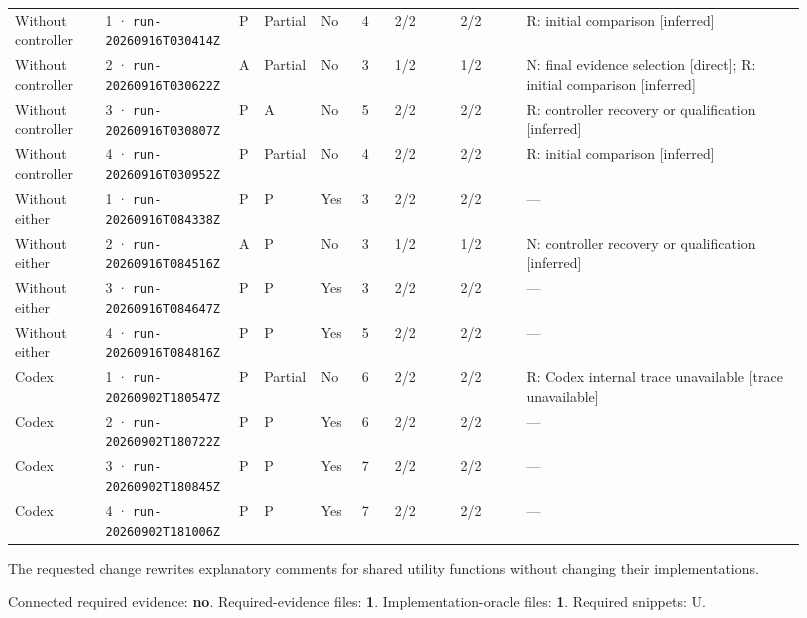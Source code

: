 \begin{landscape}
\begin{longtable}{@{}L{0.11\linewidth}L{0.16\linewidth}*{2}{L{0.022\linewidth}}L{0.05\linewidth}L{0.045\linewidth}L{0.08\linewidth}L{0.085\linewidth}L{0.346\linewidth}@{}}
Without controller & 1 · \texttt{run-20260916\allowbreak T030414Z} & P & Partial & No & 4 & 2/2 & 2/2 & R: initial comparison [inferred] \\
Without controller & 2 · \texttt{run-20260916\allowbreak T030622Z} & A & Partial & No & 3 & 1/2 & 1/2 & N: final evidence selection [direct]; R: initial comparison [inferred] \\
Without controller & 3 · \texttt{run-20260916\allowbreak T030807Z} & P & A & No & 5 & 2/2 & 2/2 & R: controller recovery or qualification [inferred] \\
Without controller & 4 · \texttt{run-20260916\allowbreak T030952Z} & P & Partial & No & 4 & 2/2 & 2/2 & R: initial comparison [inferred] \\
Without either & 1 · \texttt{run-20260916\allowbreak T084338Z} & P & P & Yes & 3 & 2/2 & 2/2 & --- \\
Without either & 2 · \texttt{run-20260916\allowbreak T084516Z} & A & P & No & 3 & 1/2 & 1/2 & N: controller recovery or qualification [inferred] \\
Without either & 3 · \texttt{run-20260916\allowbreak T084647Z} & P & P & Yes & 3 & 2/2 & 2/2 & --- \\
Without either & 4 · \texttt{run-20260916\allowbreak T084816Z} & P & P & Yes & 5 & 2/2 & 2/2 & --- \\
Codex & 1 · \texttt{run-20260902\allowbreak T180547Z} & P & Partial & No & 6 & 2/2 & 2/2 & R: Codex internal trace unavailable [trace unavailable] \\
Codex & 2 · \texttt{run-20260902\allowbreak T180722Z} & P & P & Yes & 6 & 2/2 & 2/2 & --- \\
Codex & 3 · \texttt{run-20260902\allowbreak T180845Z} & P & P & Yes & 7 & 2/2 & 2/2 & --- \\
Codex & 4 · \texttt{run-20260902\allowbreak T181006Z} & P & P & Yes & 7 & 2/2 & 2/2 & --- \\
\end{longtable}
\endgroup
\end{landscape}

\label{sec:vuejs-vue-8528}

The requested change rewrites explanatory comments for shared utility functions without changing their implementations.

Connected required evidence: \textbf{no}. Required-evidence files: \textbf{1}. Implementation-oracle files: \textbf{1}. Required snippets: U.

